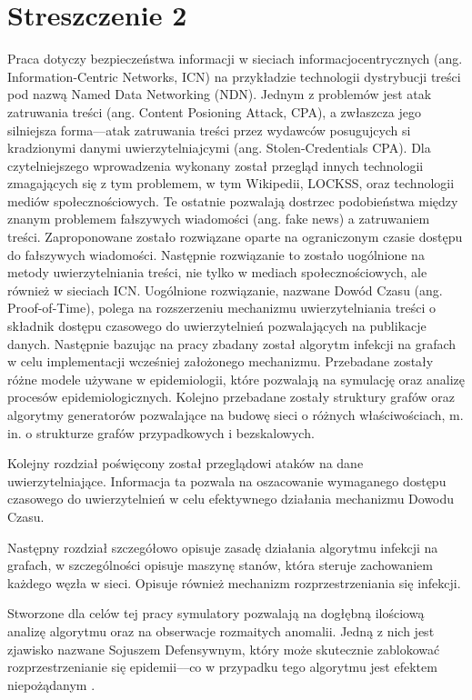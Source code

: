 \chapter*{Streszczenie 2}
Praca dotyczy bezpieczeństwa informacji w sieciach informacjocentrycznych (ang. Information-Centric Networks, ICN) na przykładzie technologii dystrybucji treści pod nazwą Named Data Networking (NDN). Jednym z problemów jest atak zatruwania treści (ang. Content Posioning Attack, CPA), a zwłaszcza jego silniejsza forma––atak zatruwania treści przez wydawców posugujcych si kradzionymi danymi uwierzytelniajcymi (ang. Stolen-Credentials CPA). Dla czytelniejszego wprowadzenia wykonany został przegląd innych technologii zmagających się z tym problemem, w tym Wikipedii, LOCKSS, oraz technologii mediów społecznościowych. Te ostatnie pozwalają dostrzec podobieństwa między znanym problemem fałszywych wiadomości (ang. fake news) a zatruwaniem treści. Zaproponowane zostało rozwiązane oparte na ograniczonym czasie dostępu do fałszywych wiadomości. Następnie rozwiązanie to zostało uogólnione na metody uwierzytelniania treści, nie tylko w mediach społecznościowych, ale również w sieciach ICN. Uogólnione rozwiązanie, nazwane Dowód Czasu (ang. Proof-of-Time), polega na rozszerzeniu mechanizmu uwierzytelniania treści o składnik dostępu czasowego do uwierzytelnień pozwalających na publikacje danych.
Następnie bazując na pracy \cite{konorski2019mitigating} zbadany został algorytm infekcji na grafach w celu implementacji wcześniej założonego mechanizmu. Przebadane zostały różne modele używane w epidemiologii, które pozwalają na symulację oraz analizę procesów epidemiologicznych.
Kolejno przebadane zostały struktury grafów oraz algorytmy generatorów pozwalające na budowę sieci o różnych właściwościach, m. in. o strukturze grafów przypadkowych i bezskalowych.

Kolejny rozdział poświęcony został przeglądowi ataków na dane uwierzytelniające. Informacja ta pozwala na oszacowanie wymaganego dostępu czasowego do uwierzytelnień w celu efektywnego działania mechanizmu Dowodu Czasu.

Następny rozdział szczegółowo opisuje zasadę działania algorytmu infekcji na grafach, w szczególności opisuje maszynę stanów, która steruje zachowaniem każdego węzła w sieci. Opisuje również mechanizm rozprzestrzeniania się infekcji.

Stworzone dla celów tej pracy symulatory pozwalają na dogłębną ilościową analizę algorytmu oraz na obserwacje rozmaitych anomalii. Jedną z nich jest zjawisko nazwane Sojuszem Defensywnym, który może skutecznie zablokować rozprzestrzenianie się epidemii––co w przypadku tego algorytmu jest efektem niepożądanym .

